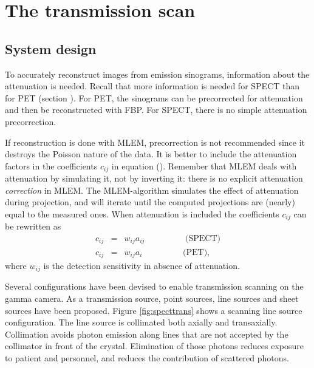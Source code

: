 \chapter{The transmission scan \label{ch:trans}}


\section{System design}
To accurately reconstruct images from emission sinograms, information about
the attenuation is needed. Recall that more information is needed for SPECT
than for PET (section ). For PET, the
sinograms can be precorrected for attenuation and then be reconstructed with
FBP. For SPECT, there is no simple attenuation precorrection.

If reconstruction is done with MLEM, precorrection is not recommended since it
destroys the Poisson nature of the data. It is better to include the
attenuation factors in the coefficients $c_{ij}$ in equation
(). Remember that MLEM deals with attenuation by simulating it,
not by inverting it: there is no explicit attenuation {\em correction} in
MLEM. The MLEM-algorithm simulates the effect of attenuation during
projection, and will iterate until the computed projections are (nearly) equal
to the measured ones. When attenuation is included the coefficients $c_{ij}$
can be rewritten as
\begin{eqnarray}
  c_{ij} & = & w_{ij} a_{ij} \hspace{2cm} \mbox{(SPECT)}\\
  c_{ij} & = & w_{ij} a_{i}  \hspace{2cm} \mbox{(PET)},
\end{eqnarray}
where $w_{ij}$ is the detection sensitivity in absence of attenuation.

Several configurations have been devised to enable transmission
scanning on the gamma camera. As a transmission source, point sources,
line sources and sheet sources have been proposed. Figure
\ref{fig:specttrans} shows a scanning line source configuration. The
line source is collimated both axially and transaxially. Collimation
avoids photon emission along lines that are not accepted by the
collimator in front of the crystal. Elimination of those photons
reduces exposure to patient and personnel, and reduces the
contribution of scattered photons.

